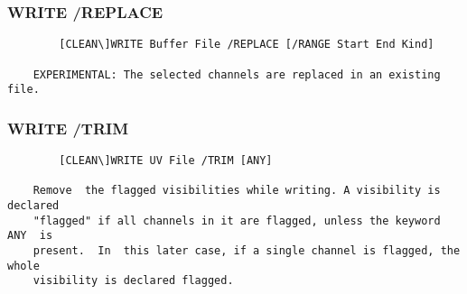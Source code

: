 \subsubsection{WRITE /REPLACE}
\begin{verbatim}
        [CLEAN\]WRITE Buffer File /REPLACE [/RANGE Start End Kind]

    EXPERIMENTAL: The selected channels are replaced in an existing file.

\end{verbatim}
\subsubsection{WRITE /TRIM}
\begin{verbatim}
        [CLEAN\]WRITE UV File /TRIM [ANY]

    Remove  the flagged visibilities while writing. A visibility is declared
    "flagged" if all channels in it are flagged, unless the keyword  ANY  is
    present.  In  this later case, if a single channel is flagged, the whole
    visibility is declared flagged.



\end{verbatim}
